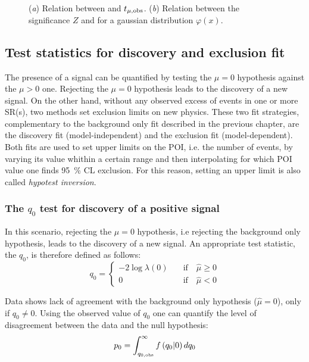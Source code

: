 \begin{figure}[tp]
\centering
{}
\caption{(\emph{a}) Relation between \p and $t_{\mu,\textup{obs}}$. (\emph{b}) Relation between the significance $Z$ and \p for a gaussian distribution $\varphi(x)$.}
\label{pvalue}
\end{figure}

\subsection{Test statistics for discovery and exclusion fit}
The presence of a signal can be quantified by testing the $\mu=0$ hypothesis against the $\mu>0$ one. Rejecting the $\mu=0$ hypothesis leads to the discovery of a new signal. On the other hand, without any observed excess of events in one or more SR(s), two methods set exclusion limits on new physics. These two fit strategies, complementary to the background only fit described in the previous chapter, are the discovery fit (model-independent) and the exclusion fit (model-dependent). Both fits are used to set upper limits on the POI, i.e. the number of events, by varying its value whithin a certain range and then interpolating for which POI value one finds \SI{95}{\percent} CL exclusion. For this reason, setting an upper limit is also called \emph{hypotest inversion}.

\subsubsection{The $q_0$ test for discovery of a positive signal}
In this scenario, rejecting the $\mu = 0$ hypothesis, i.e rejecting the background only hypothesis, leads to the discovery of a new signal.  An appropriate test statistic, the $q_0$, is therefore defined as follows:
\begin{equation}
q_0=
\left\{
\begin{aligned}
-2\log{\lambda(0)}\quad &\text{if}\quad \hat{\mu}\ge0\\
 0 \qquad&\text{if}\quad \hat{\mu}<0
\end{aligned}
\right.
\end{equation} 

Data shows lack of agreement with the background only hypothesis ($\hat{\mu}=0$), only if $q_0\ne0$. Using the observed value of $q_0$ one can quantify the level of disagreement between the data and the null hypothesis:
\begin{equation}
 p_{0}=\int_{q_{0,\textup{obs}}}^\infty f\left(q_0 \vert 0\right) dq_0
 \label{eqn:pdaq0}
\end{equation}

